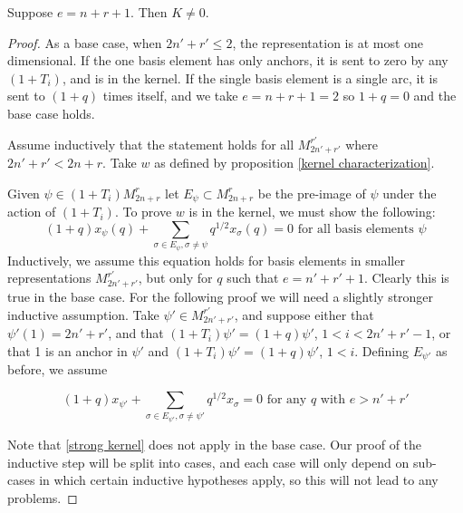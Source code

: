 \documentclass{amsart}
\begin{document}
 \vspace{5mm}
 \begin{theorem}
 	Suppose $e=n+r+1$. Then $K\not=0$.
 	\label{kernel existence}
 \end{theorem}
 
 \begin{proof}
 	
 	
 	As a base case, when $2n'+r'\leq 2$, the representation is at most one dimensional. If the one basis element has only anchors, it is sent to zero by any $(1+T_i)$, and is in the kernel. If the single basis element is a single arc, it is sent to $(1+q)$ times itself, and we take $e=n+r+1=2$ so $1+q=0$ and the base case holds.
 	
 	\vspace{5mm}
 	
 	Assume inductively that the statement holds for all $M_{2n'+r'}^{r'}$ where $2n'+r'<2n+r$. Take $w$ as defined by proposition \ref{kernel characterization}.
 	
 	Given $\psi\in (1+T_i)M_{2n+r}^r$ let $E_\psi\subset M_{2n+r}^r$ be the pre-image of $\psi$ under the action of $(1+T_i)$. To prove $w$ is in the kernel, we must show the following: 
 	\begin{equation}
 	(1+q)x_\psi(q)+\sum_{\sigma\in E_\psi,\sigma\not=\psi}q^{1/2}x_\sigma(q)=0\text{ for all basis elements }\psi
 	\label{weak kernel}
 	\end{equation}
 	Inductively, we assume this equation holds for basis elements in smaller representations $M_{2n'+r'}^{r'}$, but only for $q$ such that $e=n'+r'+1$. Clearly this is true in the base case. For the following proof we will need a slightly stronger inductive assumption. Take $\psi'\in M_{2n'+r'}^{r'}$, and suppose either that $\psi'(1)=2n'+r'$, and that $(1+T_i)\psi'=(1+q)\psi'$, $1<i<2n'+r'-1$, or that 1 is an anchor in $\psi'$ and $(1+T_i)\psi'=(1+q)\psi'$, $1<i$. Defining $E_{\psi'}$ as before, we assume
 	
 	\begin{equation}
 	(1+q)x_{\psi'}+\sum_{\sigma\in E_{\psi'},\sigma\not=\psi'}q^{1/2}x_\sigma=0\text{ for any } q \text{ with }e>n'+r'
 	\label{strong kernel}
 	\end{equation}
 	
 	Note that \ref{strong kernel} does not apply in the base case. Our proof of the inductive step will be split into cases, and each case will only depend on sub-cases in which certain inductive hypotheses apply, so this will not lead to any problems.
 	

\end{proof}
\end{document}
